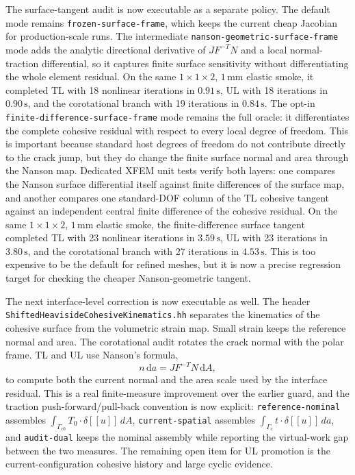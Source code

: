 The surface-tangent audit is now executable as a separate policy.  The default
mode remains \texttt{frozen-surface-frame}, which keeps the current cheap
Jacobian for production-scale runs.  The intermediate
\texttt{nanson-geometric-surface-frame} mode adds the analytic directional
derivative of \(JF^{-T}N\) and a local normal-traction differential, so it
captures finite surface sensitivity without differentiating the whole element
residual.  On the same \(1\times1\times2\), \(1\,\mathrm{mm}\) elastic smoke,
it completed TL with 18 nonlinear iterations in \(0.91\,\mathrm{s}\), UL with
18 iterations in \(0.90\,\mathrm{s}\), and the corotational branch with 19
iterations in \(0.84\,\mathrm{s}\).  The opt-in
\texttt{finite-difference-surface-frame} mode remains the full oracle: it
differentiates the complete cohesive residual with respect to every local
degree of freedom.  This is important because standard host degrees of freedom
do not contribute directly to the crack jump, but they do change the finite
surface normal and area through the Nanson map.  Dedicated XFEM unit tests
verify both layers: one compares the Nanson surface differential itself
against finite differences of the surface map, and another compares one
standard-DOF column of the TL cohesive tangent against an independent central
finite difference of the cohesive residual.  On the same
\(1\times1\times2\), \(1\,\mathrm{mm}\) elastic smoke, the finite-difference
surface tangent completed TL with 23 nonlinear iterations in
\(3.59\,\mathrm{s}\), UL with 23 iterations in \(3.80\,\mathrm{s}\), and the
corotational branch with 27 iterations in \(4.53\,\mathrm{s}\).  This is too
expensive to be the default for refined meshes, but it is now a precise
regression target for checking the cheaper Nanson-geometric tangent.

The next interface-level correction is now executable as well.  The header
\texttt{ShiftedHeavisideCohesiveKinematics.hh} separates the kinematics of the
cohesive surface from the volumetric strain map.  Small strain keeps the
reference normal and area.  The corotational audit rotates the crack normal
with the polar frame.  TL and UL use Nanson's formula,
\begin{equation}
  n\,\mathrm{d}a =
  J F^{-T}N\,\mathrm{d}A,
  \label{eq:validation-xfem-nanson-cohesive-surface}
\end{equation}
to compute both the current normal and the area scale used by the interface
residual.  This is a real finite-measure improvement over the earlier guard,
and the traction push-forward/pull-back convention is now explicit:
\texttt{reference-nominal} assembles
\(\int_{\Gamma_{c0}}T_0\cdot\delta\left[\!\left[ u \right]\!\right]\,dA\),
\texttt{current-spatial} assembles
\(\int_{\Gamma_c}t\cdot\delta\left[\!\left[ u \right]\!\right]\,da\), and
\texttt{audit-dual} keeps the nominal assembly while reporting the virtual-work
gap between the two measures.  The remaining open item for UL promotion is the
current-configuration cohesive history and large cyclic evidence.

